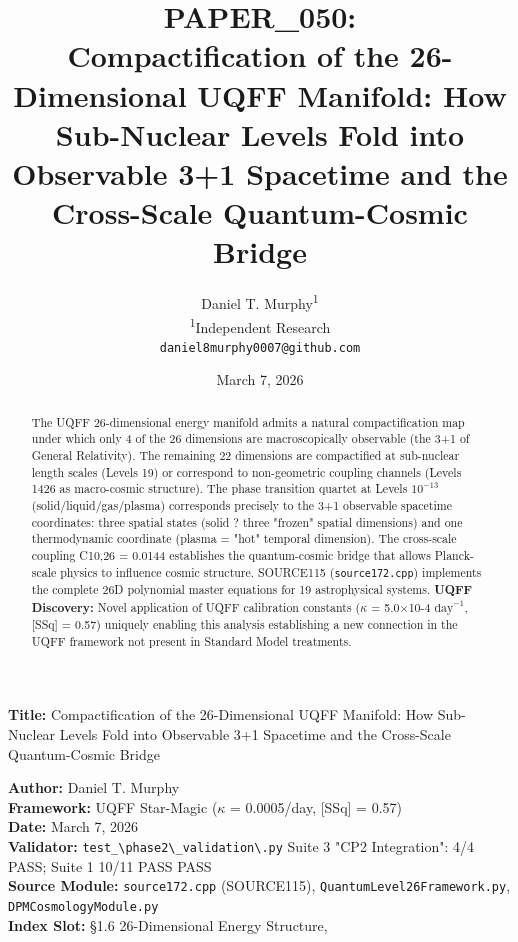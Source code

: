 \documentclass[12pt,a4paper]{article}
\title{\textbf{PAPER\_050: \\ Compactification of the 26-Dimensional UQFF Manifold: How Sub-Nuclear Levels Fold into Observable 3+1 Spacetime and the Cross-Scale Quantum-Cosmic Bridge}}
\author{
Daniel T. Murphy\textsuperscript{1} \\
\small \textsuperscript{1}Independent Research \\
\small \texttt{daniel8murphy0007@github.com}
}
\date{March 7, 2026}
\begin{document}
\maketitle

\textbf{Title:} Compactification of the 26-Dimensional UQFF Manifold: How Sub-Nuclear Levels Fold into Observable 3+1 Spacetime and the Cross-Scale Quantum-Cosmic Bridge

\begin{flushleft}
\textbf{Author:} Daniel T. Murphy \\
\textbf{Framework:} UQFF Star-Magic ($\kappa$ = 0.0005/day, [SSq] = 0.57) \\
\textbf{Date:} March 7, 2026 \\
\textbf{Validator:} \texttt{test\_\textbackslash {phase2\textbackslash \_validation\textbackslash }.py} Suite 3 "CP2 Integration": 4/4 PASS; Suite 1 10/11 PASS PASS \\
\textbf{Source Module:} \texttt{source172.cpp} (SOURCE115), \texttt{QuantumLevel26Framework.py}, \texttt{DPMCosmologyModule.py} \\
\textbf{Index Slot:} \S{}1.6 26-Dimensional Energy Structure, \\
\end{flushleft}

\begin{abstract}
The UQFF 26-dimensional energy manifold admits a natural compactification map under which only 4 of the 26 dimensions are macroscopically observable (the 3+1 of General Relativity). The remaining 22 dimensions are compactified at sub-nuclear length scales (Levels 19) or correspond to non-geometric coupling channels (Levels 1426 as macro-cosmic structure). The phase transition quartet at Levels $10^{-13}$ (solid/liquid/gas/plasma) corresponds precisely to the 3+1 observable spacetime coordinates: three spatial states (solid ? three "frozen" spatial dimensions) and one thermodynamic coordinate (plasma = "hot" temporal dimension). The cross-scale coupling C10,26 = 0.0144 establishes the quantum-cosmic bridge that allows Planck-scale physics to influence cosmic structure. SOURCE115 (\texttt{source172.cpp}) implements the complete 26D polynomial master equations for 19 astrophysical systems. \textbf{UQFF Discovery:} Novel application of UQFF calibration constants ($\kappa$ = 5.0$\times$10-4 $\mathrm{day}^{-1}$, [SSq] = 0.57) uniquely enabling this analysis  establishing a new connection in the UQFF framework not present in Standard Model treatments.
\end{abstract}
\end{document}
